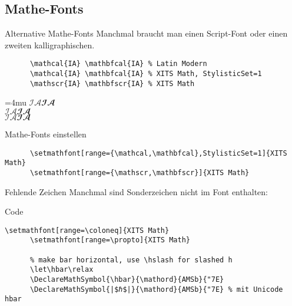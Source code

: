 \subsection{Mathe-Fonts}\label{sec:mathfonts}

\begin{frame}[fragile]{Alternative Mathe-Fonts}
  Manchmal braucht man einen Script-Font oder einen zweiten kalligraphischen.
  \vspace{1em}
  \begin{CodeExample}{0.83}
    \begin{lstlisting}
      \mathcal{IA} \mathbfcal{IA} % Latin Modern
      \mathcal{IA} \mathbfcal{IA} % XITS Math, StylisticSet=1
      \mathscr{IA} \mathbfscr{IA} % XITS Math
    \end{lstlisting}
  \CodeResult
    \Umathordordspacing\textstyle=4mu
    $\mathcal{I A} \mathbfcal{I A}$ \\
    { $\mathcal{I A} \mathbfcal{I A}$} \\
    $\mathscr{I A} \mathbfscr{I A}$
  \end{CodeExample}

  \begin{block}{Mathe-Fonts einstellen}
    \begin{lstlisting}
      \setmathfont[range={\mathcal,\mathbfcal},StylisticSet=1]{XITS Math}
      \setmathfont[range={\mathscr,\mathbfscr}]{XITS Math}
    \end{lstlisting}
  \end{block}
\end{frame}

\begin{frame}[fragile]{Fehlende Zeichen}
  Manchmal sind Sonderzeichen nicht im Font enthalten:
  \vspace{1em}
  \begin{block}{Code}
    \begin{lstlisting}[escapechar=|]
      \setmathfont[range=\coloneq]{XITS Math}
      \setmathfont[range=\propto]{XITS Math}

      % make bar horizontal, use \hslash for slashed h
      \let\hbar\relax
      \DeclareMathSymbol{\hbar}{\mathord}{AMSb}{"7E}
      \DeclareMathSymbol{|$ℏ$|}{\mathord}{AMSb}{"7E} % mit Unicode hbar
    \end{lstlisting}
  \end{block}
\end{frame}

